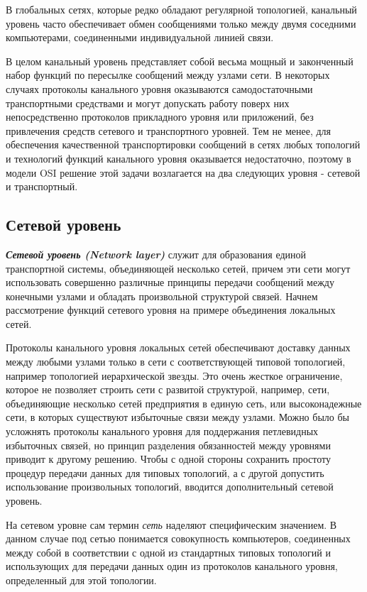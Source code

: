 В глобальных сетях, которые редко обладают регулярной топологией, канальный уровень часто обеспечивает обмен сообщениями только между двумя соседними компьютерами, соединенными индивидуальной линией связи.

В целом канальный уровень представляет собой весьма мощный и законченный набор функций по пересылке сообщений между узлами сети.
В некоторых случаях протоколы канального уровня оказываются самодостаточными транспортными средствами и могут допускать работу поверх них непосредственно протоколов прикладного уровня или приложений, без привлечения средств сетевого и транспортного уровней.
Тем не менее, для обеспечения качественной транспортировки сообщений в сетях любых топологий и технологий функций канального уровня оказывается недостаточно, поэтому в модели OSI решение этой задачи возлагается на два следующих уровня - сетевой и транспортный.

\subsection{Сетевой уровень}

\textbf{\textit{Сетевой уровень (Network layer)}} служит для образования единой транспортной системы, объединяющей несколько сетей, причем эти сети могут использовать совершенно различные принципы передачи сообщений между конечными узлами и обладать произвольной структурой связей.
Начнем рассмотрение функций сетевого уровня на примере объединения локальных сетей.

Протоколы канального уровня локальных сетей обеспечивают доставку данных между любыми узлами только в сети с соответствующей типовой топологией, например топологией иерархической звезды.
Это очень жесткое ограничение, которое не позволяет строить сети с развитой структурой, например, сети, объединяющие несколько сетей предприятия в единую сеть, или высоконадежные сети, в которых существуют избыточные связи между узлами.
Можно было бы усложнять протоколы канального уровня для поддержания петлевидных избыточных связей, но принцип разделения обязанностей между уровнями приводит к другому решению.
Чтобы с одной стороны сохранить простоту процедур передачи данных для типовых топологий, а с другой допустить использование произвольных топологий, вводится дополнительный сетевой уровень.

На сетевом уровне сам термин \emph{сеть} наделяют специфическим значением.
В данном случае под сетью понимается совокупность компьютеров, соединенных между собой в соответствии с одной из стандартных типовых топологий и использующих для передачи данных один из протоколов канального уровня, определенный для этой топологии.

